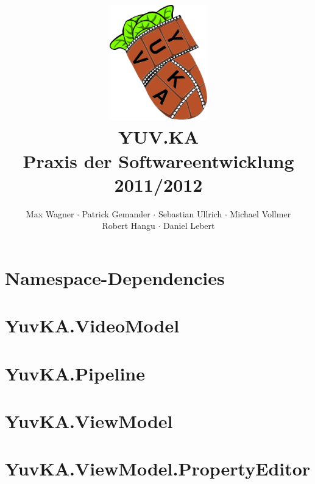 \documentclass{scrartcl}
\begin{document}
\title{
    \hspace{-0.5cm} \includegraphics[height=5cm]{logo.png} \\[1cm]
    \Huge{YUV.KA} \\ \large{Praxis der Softwareentwicklung 2011/2012}
}
\author{Max Wagner $\cdot$ Patrick Gemander $\cdot$ Sebastian Ullrich $\cdot$ Michael Vollmer \\ Robert Hangu $\cdot$ Daniel Lebert}
\maketitle

\newpage
\mbox{}
\newpage
\mbox{}

\tableofcontents

\section{Namespace-Dependencies}

\clearpage

\section{YuvKA.VideoModel}

\clearpage

\section{YuvKA.Pipeline}







\section{YuvKA.ViewModel}




\section{YuvKA.ViewModel.PropertyEditor}





\end{document}
